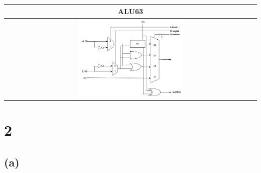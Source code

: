 \documentclass[12pt]{article}
\begin{document}
\begin{center}
\begin{table}[h]
\begin{tabular}{|c|c|}
            \hline
            \multicolumn{2}{|c|}{\textbf{ALU63}} \\
            \hline
            \multicolumn{2}{|c|}{\includegraphics[width=0.42\textwidth]{./img/q1_bit63.png}} \\
            \hline
        \end{tabular}
    \end{table}
\end{center}

\clearpage

\section*{2}

\subsection*{(a)}
\end{document}
